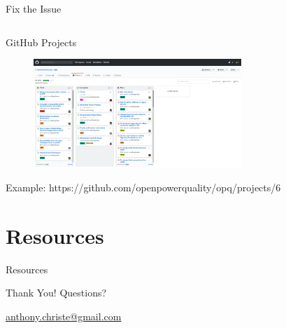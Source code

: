 \documentclass{beamer}
\begin{document}
    \begin{frame}{Fix the Issue}
        \begin{columns}

        \end{columns}
    \end{frame}

    \begin{frame}{GitHub Projects}
        \begin{figure}
            \centering
            \includegraphics[width=0.7\textwidth]{figures/github_project.png}
        \end{figure}
        \centering
        Example: https://github.com/openpowerquality/opq/projects/6
    \end{frame}

    \section{Resources}\label{sec:resources}
    \begin{frame}{Resources}
    \end{frame}

    \begin{frame}{Thank You!}
        \centering
        Questions?

        \href{mailto:anthony.christe@gmail.com}{anthony.christe@gmail.com}
    \end{frame}
\end{document}
